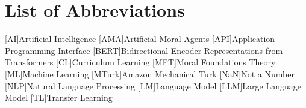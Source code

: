 \chapter*{List of Abbreviations}

\begin{acronym}[AMAnnn]
[AI]{Artificial Intelligence}
[AMA]{Artificial Moral Agents}
[API]{Application Programming Interface}
[BERT]{Bidirectional Encoder Representations from Transformers}
[CL]{Curriculum Learning}
[MFT]{Moral Foundations Theory}
[ML]{Machine Learning}
[MTurk]{Amazon Mechanical Turk}
[NaN]{Not a Number}
[NLP]{Natural Language Processing}
[LM]{Language Model}
[LLM]{Large Language Model}
[TL]{Transfer Learning}
\end{acronym}